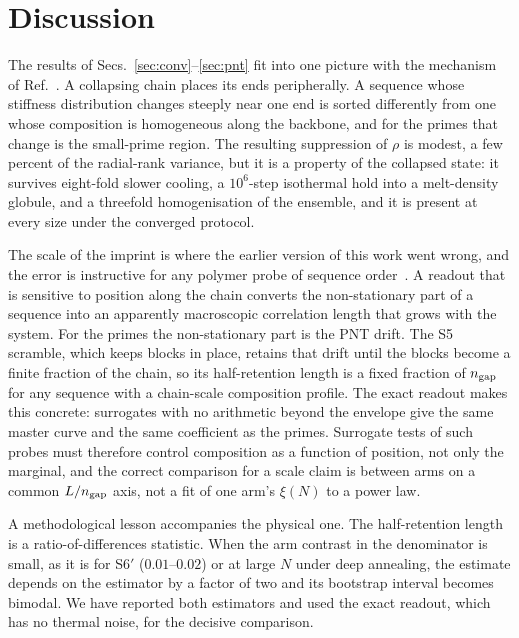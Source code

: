 \documentclass[reprint,amsmath,amssymb,aps,pre,longbibliography]{revtex4-2}
\begin{document}
\section{Discussion}\label{sec:disc}

The results of Secs.~\ref{sec:conv}--\ref{sec:pnt} fit into one picture with the mechanism
of Ref.~\cite{PDTP4}. A collapsing chain places its ends peripherally. A sequence whose
stiffness distribution changes steeply near one end is sorted differently from one whose
composition is homogeneous along the backbone, and for the primes that change is the
small-prime region. The resulting suppression of $\rho$ is modest, a few percent of the
radial-rank variance, but it is a property of the collapsed state: it survives eight-fold
slower cooling, a $10^{6}$-step isothermal hold into a melt-density globule, and a
threefold homogenisation of the ensemble, and it is present at every size under the
converged protocol.

The scale of the imprint is where the earlier version of this work went wrong, and the error
is instructive for any polymer probe of sequence order~\cite{Odijk}. A readout that is
sensitive to position along the chain converts the non-stationary part of a sequence into
an apparently macroscopic correlation length that grows with the system. For the primes the
non-stationary part is the PNT drift. The S5 scramble, which keeps blocks in place, retains
that drift until the blocks become a finite fraction of the chain, so its half-retention
length is a fixed fraction of $n_{\rm gap}$ for any sequence with a chain-scale composition
profile. The exact readout makes this concrete: surrogates with no arithmetic beyond the
envelope give the same master curve and the same coefficient as the primes. Surrogate tests
of such probes must therefore control composition as a function of position, not only the
marginal, and the correct comparison for a scale claim is between arms on a common
$L/n_{\rm gap}$ axis, not a fit of one arm's $\xi(N)$ to a power law.

A methodological lesson accompanies the physical one. The half-retention length is a
ratio-of-differences statistic. When the arm contrast in the denominator is small, as it is
for S6$'$ ($0.01$--$0.02$) or at large $N$ under deep annealing, the estimate depends on the
estimator by a factor of two and its bootstrap interval becomes bimodal. We have reported
both estimators and used the exact readout, which has no thermal noise, for the decisive
comparison.
\end{document}
